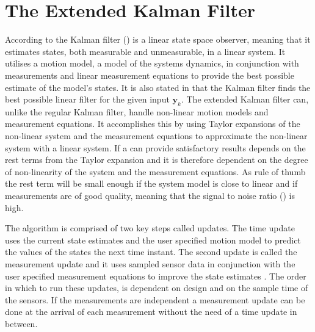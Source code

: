 \section{The Extended Kalman Filter}
According to \citet{sensorfusion} the Kalman filter (\abbrKF) is a linear state space observer, meaning that it estimates states, both measurable and unmeasurable, in a linear system. It utilises a motion model, a model of the systems dynamics, in conjunction with measurements and linear measurement equations to provide the best possible estimate of the model's states. It is also stated in \citet{sensorfusion} that the Kalman filter finds the best possible linear filter for the given input $\boldsymbol{y}_{k}$. The extended Kalman filter can, unlike the regular Kalman filter, handle non-linear motion models and measurement equations. It accomplishes this by using Taylor expansions of the non-linear system and the measurement equations to approximate the non-linear system with a linear system. If a \abbrEKF can provide satisfactory results depends on the rest terms from the Taylor expansion and it is therefore dependent on the degree of non-linearity of the system and the measurement equations\citep{sensorfusion}. As rule of thumb the rest term will be small enough if the system model is close to linear and if measurements are of good quality, meaning that the signal to noise ratio (\abbrSNR) is high\citep{sensorfusion}. 

The \abbrEKF algorithm is comprised of two key steps called updates.
The time update uses the current state estimates and the user specified motion model to predict the values of the states the next time instant. The second update is called the measurement update and it uses sampled sensor data in conjunction with the user specified measurement equations to improve the state estimates \citep{sensorfusion}.
The order in which to run these updates, is dependent on design and on the sample time of the sensors. If the measurements are independent a measurement update can be done at the arrival of each measurement without the need of a time update in between\citep[p.170]{sensorfusion}.

